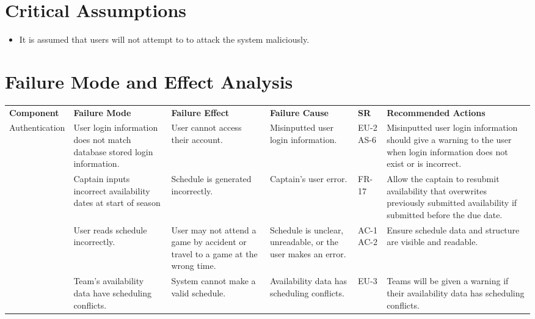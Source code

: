 \documentclass{article}
\begin{document}
\section{Critical Assumptions}

\begin{itemize}
    \item It is assumed that users will not attempt to to attack the system maliciously.
\end{itemize}

\section{Failure Mode and Effect Analysis}

\begin{landscape}
\def\arraystretch{1.2}
\begin{tabularx}{504pt}{|p{3cm}||p{4cm}|p{4cm}|p{4cm}|p{1cm}|p{5.75cm}|}
\cline{1-6}
\textbf{Component} & \textbf{Failure Mode} & \textbf{Failure Effect} & \textbf{Failure Cause} & \textbf{SR} & \textbf{Recommended Actions}\\
\cline{1-6}
\multirow{2}{2cm}{Authentication} & User login information does not match database stored
login information. & User cannot access their account. & Misinputted user login information.
& EU-2 AS-6 & Misinputted user login information should give a warning to the user when
login information does not exist or is incorrect.\\
\cline{1-6}
\multirow{2}{2cm}{Scheduling} & Captain inputs incorrect availability dates at
start of season & Schedule is generated incorrectly. & Captain's user error. &
FR-17 & Allow the captain to resubmit availability that overwrites previously
submitted availability if submitted before the due date.\\
\cline{2-6}
& User reads schedule incorrectly. & User may not attend a game by accident or
travel to a game at the wrong time. & Schedule is unclear, unreadable, or the user
makes an error. & AC-1 AC-2 & Ensure schedule data and structure are visible and
readable.\\
\cline{2-6}
& Team's availability data have scheduling conflicts. & System cannot make a
valid schedule. & Availability data has scheduling conflicts. & EU-3 & Teams
will be given a warning if their availability data has scheduling conflicts.\\

\end{tabularx}
\end{landscape}
\end{document}
